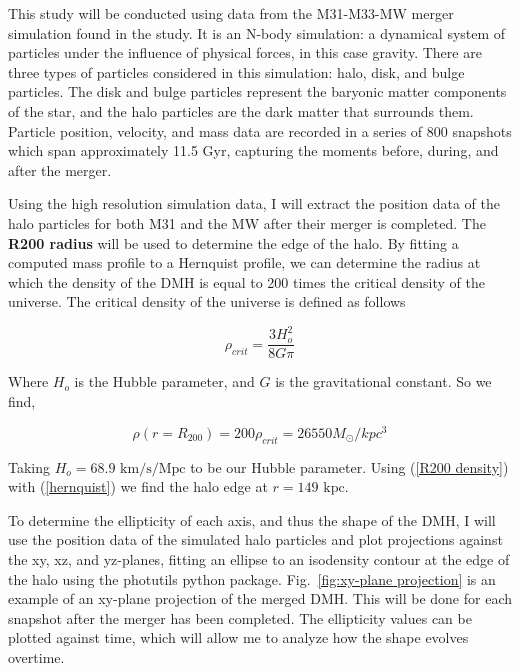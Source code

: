 \documentclass[fleqn,usenatbib]{mnras}
\begin{document}
This study will be conducted using data from the M31-M33-MW merger simulation found in the \citet{van_der_Marel_2012} study. It is an N-body simulation: a dynamical system of particles under the influence of physical forces, in this case gravity. There are three types of particles considered in this simulation: halo, disk, and bulge particles. The disk and bulge particles represent the baryonic matter components of the star, and the halo particles are the dark matter that surrounds them. Particle position, velocity, and mass data are recorded in a series of 800 snapshots which span approximately 11.5 Gyr, capturing the moments before, during, and after the merger.

Using the high resolution simulation data, I will extract the position data of the halo particles for both M31 and the MW after their merger is completed.  The \textbf{R200 radius} will be used to determine the edge of the halo. By fitting a computed mass profile to a Hernquist profile, we can determine the radius at which the density of the DMH is equal to 200 times the critical density of the universe. The critical density of the universe is defined as follows

\begin{equation} \label{critical density}
    \rho_{crit}=\frac{3H_o^2}{8G\pi}
\end{equation}

Where \begin{math}H_{o}\end{math} is the Hubble parameter, and \begin{math}G\end{math} is the gravitational constant. So we find,

\begin{equation} \label{R200 density}
    \rho(r=R_{200})=200\rho_{crit}=26550 M_\odot /kpc^3
\end{equation}

Taking \begin{math}H_o=68.9\text{ km/s/Mpc}\end{math} to be our Hubble parameter. Using (\ref{R200 density}) with (\ref{hernquist}) we find the halo edge at \begin{math}r=149\text{ kpc}\end{math}.

To determine the ellipticity of each axis, and thus the shape of the DMH, I will use the position data of the simulated halo particles and plot projections against the xy, xz, and yz-planes, fitting an ellipse to an isodensity contour at the edge of the halo using the photutils python package. Fig.~\ref{fig:xy-plane projection} is an example of an xy-plane projection of the merged DMH. This will be done for each snapshot after the merger has been completed. The ellipticity values can be plotted against time, which will allow me to analyze how the shape evolves overtime.
\end{document}
